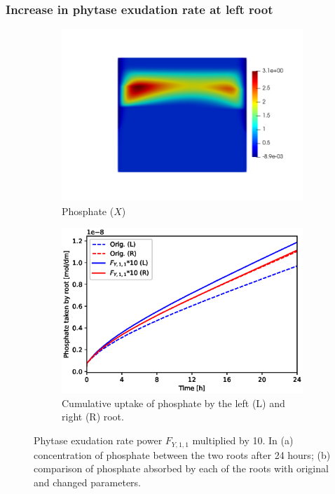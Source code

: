 \documentclass[11pt]{article}
\numberwithin{equation}{section}
\begin{document}
\FloatBarrier
\subsubsection{Increase in phytase exudation rate at left root}
\begin{figure}[!htb]
\centering
\begin{subfigure}[t]{0.45\textwidth}
    \includegraphics[trim= 100 100 60 100,width=\textwidth]{Figures/X_Fy11times10.png}
    \caption{Phosphate ($X$)}
\end{subfigure}
\qquad
\begin{subfigure}[t]{0.45\textwidth}
    \includegraphics[width=\textwidth]{Figures/Fy11times10.eps}
    \caption{Cumulative uptake of phosphate by the left (L) and right (R) root.}
\end{subfigure}

\caption{Phytase exudation rate power $F_{Y,1,1}$ multiplied by 10. In (a) concentration of phosphate between the two roots after 24 hours; (b) comparison of phosphate absorbed by each of the roots with original and changed parameters.}
\end{figure}
\end{document}
